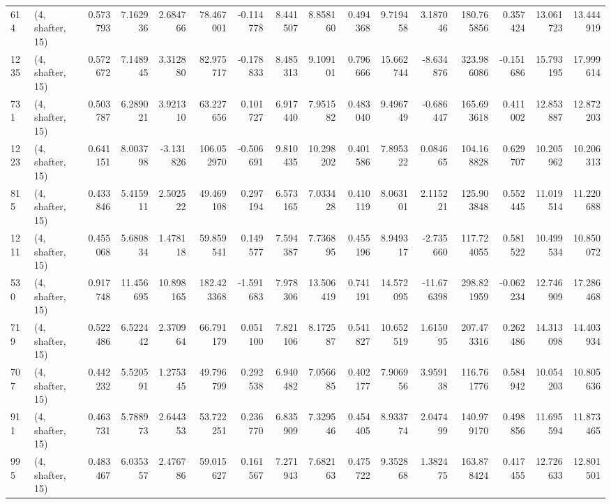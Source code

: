 \begin{tabular}{llrrrrrrrrrrrrrr}
614  &  (4, shafter, 15) &   0.573793 &   7.162936 &   2.684766 &     78.467001 &   -0.114778 &    8.441507 &    8.858160 &  0.494368 &   9.719458 &   3.187046 &   180.765856 &   0.357424 &  13.061723 &  13.444919 \\
1235 &  (4, shafter, 15) &   0.572672 &   7.148945 &   3.312880 &     82.975717 &   -0.178833 &    8.485313 &    9.109101 &  0.796666 &  15.662744 &  -8.634876 &   323.986086 &  -0.151686 &  15.793195 &  17.999614 \\
731  &  (4, shafter, 15) &   0.503787 &   6.289021 &   3.921310 &     63.227656 &    0.101727 &    6.917440 &    7.951582 &  0.483040 &   9.496749 &  -0.686447 &   165.693618 &   0.411002 &  12.853887 &  12.872203 \\
1223 &  (4, shafter, 15) &   0.641151 &   8.003798 &  -3.131826 &    106.052970 &   -0.506691 &    9.810435 &   10.298202 &  0.401586 &   7.895322 &   0.084665 &   104.168828 &   0.629707 &  10.205962 &  10.206313 \\
815  &  (4, shafter, 15) &   0.433846 &   5.415911 &   2.502522 &     49.469108 &    0.297194 &    6.573165 &    7.033428 &  0.410119 &   8.063101 &   2.115221 &   125.903848 &   0.552445 &  11.019514 &  11.220688 \\
1211 &  (4, shafter, 15) &   0.455068 &   5.680834 &   1.478118 &     59.859541 &    0.149577 &    7.594387 &    7.736895 &  0.455196 &   8.949317 &  -2.735660 &   117.724055 &   0.581522 &  10.499534 &  10.850072 \\
530  &  (4, shafter, 15) &   0.917748 &  11.456695 &  10.898165 &    182.423368 &   -1.591683 &    7.978306 &   13.506419 &  0.741191 &  14.572095 & -11.676398 &   298.821959 &  -0.062234 &  12.746909 &  17.286468 \\
719  &  (4, shafter, 15) &   0.522486 &   6.522442 &   2.370964 &     66.791179 &    0.051100 &    7.821106 &    8.172587 &  0.541827 &  10.652519 &   1.615095 &   207.473316 &   0.262486 &  14.313098 &  14.403934 \\
707  &  (4, shafter, 15) &   0.442232 &   5.520591 &   1.275345 &     49.796799 &    0.292538 &    6.940482 &    7.056685 &  0.402177 &   7.906956 &   3.959138 &   116.761776 &   0.584942 &  10.054203 &  10.805636 \\
911  &  (4, shafter, 15) &   0.463731 &   5.788973 &   2.644353 &     53.722251 &    0.236770 &    6.835909 &    7.329546 &  0.454405 &   8.933774 &   2.047499 &   140.979170 &   0.498856 &  11.695594 &  11.873465 \\
995  &  (4, shafter, 15) &   0.483467 &   6.035357 &   2.476786 &     59.015627 &    0.161567 &    7.271943 &    7.682163 &  0.475722 &   9.352868 &   1.382475 &   163.878424 &   0.417455 &  12.726633 &  12.801501 \\

\end{tabular}
